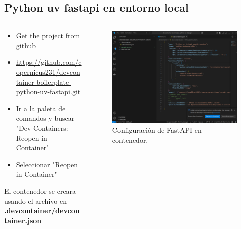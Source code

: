 \documentclass{beamer}
\begin{document}
\subsection{Python uv fastapi en entorno local}
\begin{frame}{\subsecname}
  \begin{columns}
    \begin{column}{0.7\textwidth}
      \begin{itemize}
        \small
        \item Get the project from github
        \item \href{https://github.com/copernicus231/devcontainer-boilerplate-python-uv-fastapi.git}{https://github.com/copernicus231/devcontainer-boilerplate-python-uv-fastapi.git}
        \item Ir a la paleta de comandos y buscar "Dev Containers: Reopen in Container"
        \item Seleccionar "Reopen in Container"
        \normalsize    \end{itemize}
      El contenedor se creara usando el archivo en \textbf{.devcontainer/devcontainer.json}
    \end{column}
    \begin{column}{0.3\textwidth}
      \begin{figure}
        \centering
        \includegraphics[width=\textwidth]{images/open-container.png}
        \caption{Configuración de FastAPI en contenedor.}
      \end{figure}
    \end{column}
  \end{columns}
\end{frame}
\end{document}
